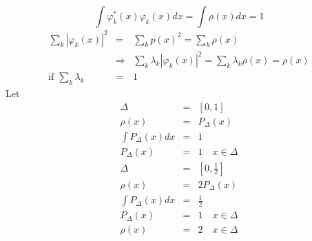 \documentclass{article}
\begin{document}
\[
\int \varphi _{k}^{\ast }\left( x\right) \varphi _{k}\left( x\right) dx=\int
\rho \left( x\right) dx=1
\]%
\begin{eqnarray*}
\sum_{k}\left\vert \varphi _{k}\left( x\right) \right\vert ^{2}
&=&\sum_{k}p\left( x\right) ^{2}=\sum_{k}\rho \left( x\right)  \\
&\Rightarrow &\sum_{k}\lambda _{k}\left\vert \varphi _{k}\left( x\right)
\right\vert ^{2}=\sum_{k}\lambda _{k}\rho \left( x\right) =\rho \left(
x\right)  \\
\text{if }\sum_{k}\lambda _{k} &=&1
\end{eqnarray*}%
Let%
\begin{eqnarray*}
\Delta  &=&\left[ 0,1\right]  \\
\rho \left( x\right)  &=&P_{\Delta }\left( x\right)  \\
\int P_{\Delta }\left( x\right) dx &=&1 \\
P_{\Delta }\left( x\right)  &=&1\quad x\in \Delta 
\end{eqnarray*}%
\begin{eqnarray*}
\Delta  &=&\left[ 0,\frac{1}{2}\right]  \\
\rho \left( x\right)  &=&2P_{\Delta }\left( x\right)  \\
\int P_{\Delta }\left( x\right) dx &=&\frac{1}{2} \\
P_{\Delta }\left( x\right)  &=&1\quad x\in \Delta  \\
\rho \left( x\right)  &=&2\quad x\in \Delta 
\end{eqnarray*}
\end{document}
